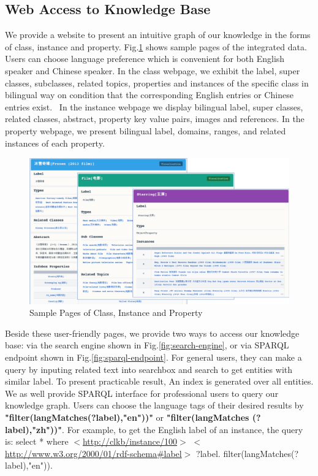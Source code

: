 \documentclass[runningheads,a4paper]{llncs}
\begin{document}
\subsection{Web Access to Knowledge Base}
We provide a website to present an intuitive graph of our knowledge in the forms of class, instance and property. Fig.\ref{fig:xlore} shows sample pages of the integrated data. Users can choose language preference which is convenient for both English speaker and Chinese speaker. In the class webpage, we exhibit the label, super classes, subclasses, related topics, properties and instances of the specific class in bilingual way on condition that the corresponding English entries or Chinese entries exist.  In the instance webpage we display bilingual label, super classes, related classes, abstract, property key value pairs, images and references. In the property webpage, we present bilingual label, domains, ranges, and related instances of each property.
\begin{figure}[ht]
    \centerline{\includegraphics[width=1\columnwidth]{fig/xlore}}
    \caption{Sample Pages of Class, Instance and Property}
    \label{fig:xlore}
\end{figure}%
Beside these user-friendly pages, we provide two ways to access our knowledge base: via the search engine shown in Fig.\ref{fig:search-engine}, or via SPARQL endpoint shown in Fig.\ref{fig:sparql-endpoint}. For general users, they can make a query by inputing related text into searchbox and search to get entities with similar label. To present practicable result, An index is generated over all entities. We as well provide SPARQL interface for professional users to query our knowledge graph. Users can choose the language tags of their desired results by \textbf{"filter(langMatches(?label),"en"))"} or \textbf{"filter(langMatches (?label),"zh"))"}. For example, to get the English label of an instance, the query is: select * where {$<$\url{http://clkb/instance/100}$>$ $<$\url{http://www.w3.org/2000/01/rdf-schema#label}$>$ ?label. filter(langMatches(?label),"en"))}.
\end{document}
